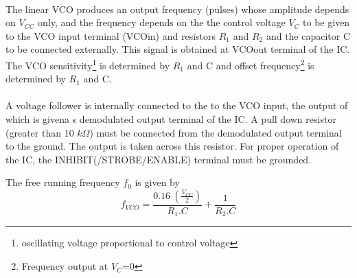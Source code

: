 \paragraph{} The linear VCO produces an output frequency (pulses) whose amplitude depends on $V_{CC}$ only,  and the frequency depends on the the control voltage $V_C$ to be given to the VCO input terminal (VCOin) and resistors $R_1$ and $R_2$ and the capacitor C to be connected externally. This signal is obtained at VCOout terminal of the IC. The VCO sensitivity\footnote{oscillating voltage proportional to control voltage} is determined by $R_1$  and C and offset frequency\footnote{Frequency output at $V_C$=0} is determined by $R_1$  and C.

\paragraph{} A voltage follower is internally connected to the to the VCO input, the output of which is givena s demodulated output terminal of the IC. A pull down resistor (greater than 10 $k\Omega$) must be connected from the demodulated output terminal  to the ground. The output is taken across this resistor. For proper operation of the IC, the INHIBIT(/STROBE/ENABLE) terminal must be grounded.

The free running frequency $f_0$ is given by 
\begin{equation}
\label{f0}
f_{VCO}=\frac{0.16\ ( \frac{V_{CC}}{2} )}{R_1.C}+\frac{1}{R_2.C}
\end{equation}

